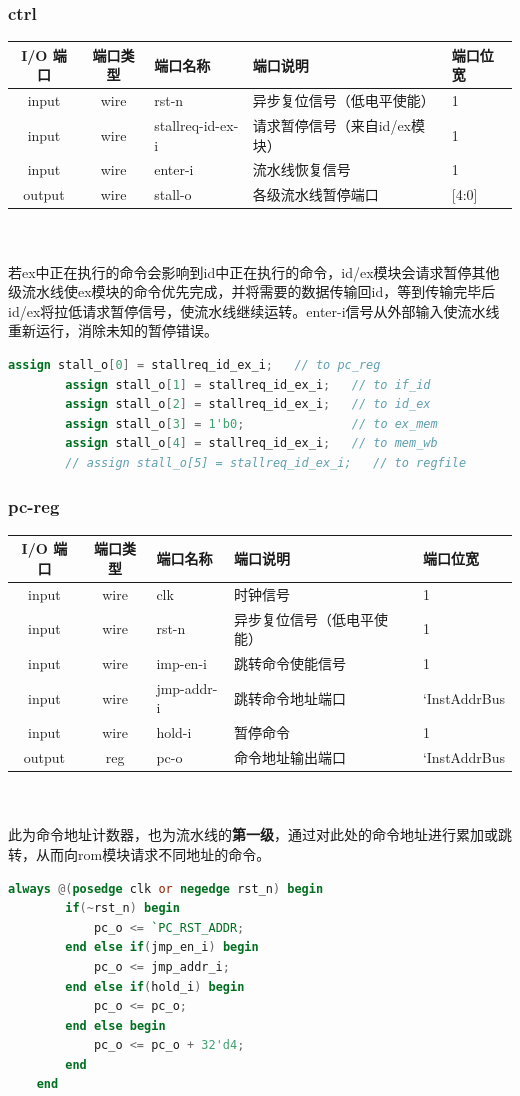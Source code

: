 \documentclass[lang=cn,11pt,a4paper]{elegantpaper}
\begin{document}
\subsubsection{ctrl}
	\begin{tabular}{cclll}
		\toprule
		I/O 端口 & 端口类型 &端口名称&端口说明 &端口位宽\\
		\midrule
		input &wire& rst-n & 异步复位信号（低电平使能） & 1 \\
		input &wire& stallreq-id-ex-i & 请求暂停信号（来自id/ex模块）       & 1   \\
		input &wire& enter-i & 流水线恢复信号& 1 \\
		output &wire& stall-o & 各级流水线暂停端口    & [4:0]   \\
		\bottomrule
	\end{tabular}\\
	\\若ex中正在执行的命令会影响到id中正在执行的命令，id/ex模块会请求暂停其他级流水线使ex模块的命令优先完成，并将需要的数据传输回id，等到传输完毕后id/ex将拉低请求暂停信号，使流水线继续运转。enter-i信号从外部输入使流水线重新运行，消除未知的暂停错误。
	\begin{lstlisting}[language=verilog]
		assign stall_o[0] = stallreq_id_ex_i;   // to pc_reg
		assign stall_o[1] = stallreq_id_ex_i;   // to if_id
		assign stall_o[2] = stallreq_id_ex_i;   // to id_ex
		assign stall_o[3] = 1'b0;               // to ex_mem
		assign stall_o[4] = stallreq_id_ex_i;   // to mem_wb
		// assign stall_o[5] = stallreq_id_ex_i;   // to regfile
	\end{lstlisting}
\subsubsection{pc-reg}
 \begin{tabular}{cclll}
	\toprule
	I/O 端口 & 端口类型 &端口名称&端口说明 &端口位宽\\
	\midrule
	input &wire& clk & 时钟信号 & 1 \\
	input &wire& rst-n & 异步复位信号（低电平使能） & 1 \\
	input &wire& imp-en-i & 跳转命令使能信号       & 1   \\
	input &wire& jmp-addr-i & 跳转命令地址端口 & `InstAddrBus \\
	input &wire&hold-i & 暂停命令 & 1  \\
	output &reg& pc-o & 命令地址输出端口    & `InstAddrBus   \\
	\bottomrule
\end{tabular}\\
\\
此为命令地址计数器，也为流水线的\textbf{第一级}，通过对此处的命令地址进行累加或跳转，从而向rom模块请求不同地址的命令。
\begin{lstlisting}[language=verilog]
    always @(posedge clk or negedge rst_n) begin
		if(~rst_n) begin
			pc_o <= `PC_RST_ADDR;
		end else if(jmp_en_i) begin
			pc_o <= jmp_addr_i;
		end else if(hold_i) begin
			pc_o <= pc_o;
		end else begin
			pc_o <= pc_o + 32'd4;
		end
	end
\end{lstlisting}
\end{document}
